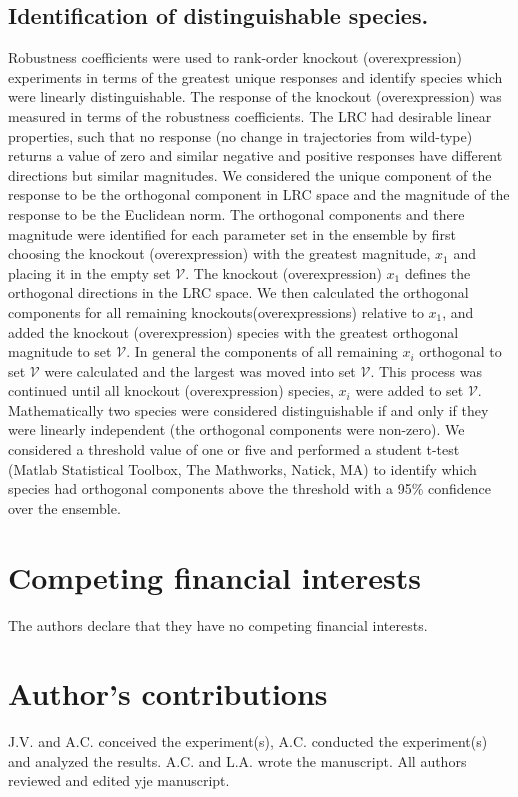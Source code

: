 \documentclass[fleqn,10pt]{wlscirep}
\begin{document}
\subsection*{Identification of distinguishable species.}
Robustness coefficients were used to rank-order knockout (overexpression) experiments in terms of the greatest unique responses and identify species which were linearly distinguishable.
The response of the knockout (overexpression) was measured in terms of the robustness coefficients. The LRC had desirable linear properties, such that no response (no change in trajectories from wild-type) returns a value of zero and similar negative and positive responses have different directions but similar magnitudes.
We considered the unique component of the response to be the orthogonal component in LRC space and the magnitude of the response to be the Euclidean norm.
The orthogonal components and there magnitude were identified for each parameter set in the ensemble by first choosing the knockout (overexpression) with the greatest magnitude, $x_{1}$ and placing it in the empty set $\mathcal{V}$.
The knockout (overexpression) $x_{1}$ defines the orthogonal directions in the LRC space. We then calculated the orthogonal components for all remaining knockouts(overexpressions) relative to $x_{1}$, and added the knockout (overexpression) species with the greatest orthogonal magnitude to set $\mathcal{V}$.
In general the components of all remaining $x_{i}$ orthogonal to set $\mathcal{V}$ were calculated and the largest was moved into set $\mathcal{V}$. This process was continued until all knockout (overexpression) species, $x_{i}$ were added to set $\mathcal{V}$.
Mathematically two species were considered distinguishable if and only if they were linearly independent (the orthogonal components were non-zero).
We considered a threshold value of one or five and performed a student t-test (Matlab Statistical Toolbox, The Mathworks, Natick, MA) to identify which species had orthogonal components above the threshold with a 95\% confidence over the ensemble.

\clearpage

\section*{Competing financial interests}
The authors declare that they have no competing financial interests.

\section*{Author's contributions}
J.V. and A.C. conceived the experiment(s), A.C. conducted the experiment(s) and analyzed the results. A.C. and L.A. wrote the manuscript.
All authors reviewed and edited yje manuscript.
\end{document}
